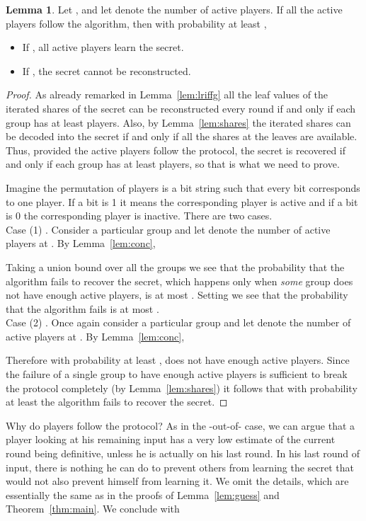 \documentclass[12pt]{article}
\theoremstyle{definition}
\newtheorem{lemma}[theorem]{Lemma}
\begin{document}
\begin{lemma}\label{lem:m}
Let , and let  denote the number of active players. If all  
the active players follow the algorithm, 
then with probability at least ,
\begin{itemize}
\item If , all active players learn the secret.
\item If , the secret cannot be reconstructed.
\end{itemize}
\end{lemma}
\begin{proof}
As already remarked in Lemma~\ref{lem:lriffg} all the leaf values of the 
iterated shares of the secret can be reconstructed every round if and only if 
each group has at least  players. Also, by 
Lemma~\ref{lem:shares} the iterated shares can be decoded into the secret
if and only if all the shares at the leaves are available. Thus, provided the  
active players  follow the protocol, the secret is recovered if and only if
each group has at least  players, so that is what we 
need to prove.

Imagine the permutation of players is a bit string such that every bit
corresponds to one player. If a bit is 1 it means the corresponding
player is active and if a bit is 0 the corresponding player is
inactive.  There are two cases.\\

\smallskip
\noindent
Case (1) .  Consider a particular group
 and let  denote the number of active players at
. By Lemma~\ref{lem:conc},

Taking a union bound over all the
 groups we see that the probability that the
algorithm fails to recover the secret, which happens only when  
\emph{some} group does not have enough active players, is at most 
. Setting  we see
that the probability that the algorithm fails is at most .\\

\smallskip
\noindent
Case (2) .  Once again consider a particular group
 and let  denote the number of active players at .
 By Lemma~\ref{lem:conc},

Therefore with probability at least ,  does not have enough active players. Since the failure of 
a single group to have enough active players is sufficient to break the
protocol completely (by Lemma~\ref{lem:shares}) it follows that with
probability at least  the algorithm fails to recover 
the secret.
\end{proof}

Why do players follow the protocol? As in the -out-of- case, we can 
argue that a player looking at his remaining input has a very low estimate 
of the current round being definitive, unless he is actually on his last round. 
In his last round of input, there is nothing he can do to prevent others 
from learning the secret that would not also prevent himself from learning 
it. We omit the details, which are essentially the same as in the proofs of 
Lemma~\ref{lem:guess} and Theorem~\ref{thm:main}. We conclude with
\end{document}
